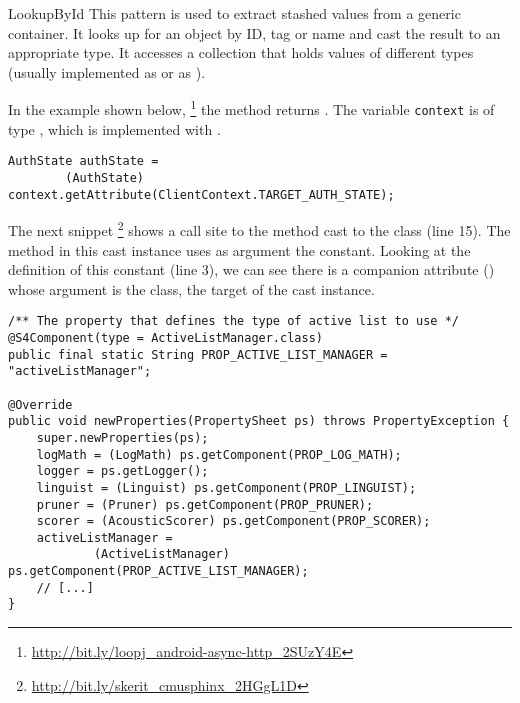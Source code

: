 \begin{pattern}{LookupById}
This pattern is used to extract stashed values from a generic container.
It looks up for an object by ID, tag or name and cast the result to an appropriate type.
It accesses a collection that holds values of different types
(usually implemented as  or as ).

\instances{}
In the example shown below,%
\footnote{\url{http://bit.ly/loopj_android-async-http_2SUzY4E}}
the  method returns .
The variable \texttt{context} is of type ,
which is implemented with .

\begin{verbatim}
AuthState authState =
        (AuthState) context.getAttribute(ClientContext.TARGET_AUTH_STATE);
\end{verbatim}

The next snippet%
\footnote{\url{http://bit.ly/skerit_cmusphinx_2HGgL1D}}
shows a call site to the  method cast to the  class (line 15).
The  method in this cast instance uses as argument the  constant.
Looking at the definition of this constant (line 3),
we can see there is a companion attribute () whose argument is the  class, the target of the cast instance.

\begin{verbatim}
/** The property that defines the type of active list to use */
@S4Component(type = ActiveListManager.class)
public final static String PROP_ACTIVE_LIST_MANAGER = "activeListManager";

@Override
public void newProperties(PropertySheet ps) throws PropertyException {
    super.newProperties(ps);
    logMath = (LogMath) ps.getComponent(PROP_LOG_MATH);
    logger = ps.getLogger();
    linguist = (Linguist) ps.getComponent(PROP_LINGUIST);
    pruner = (Pruner) ps.getComponent(PROP_PRUNER);
    scorer = (AcousticScorer) ps.getComponent(PROP_SCORER);
    activeListManager = 
            (ActiveListManager) ps.getComponent(PROP_ACTIVE_LIST_MANAGER);
    // [...]
}
\end{verbatim}



\end{pattern}
